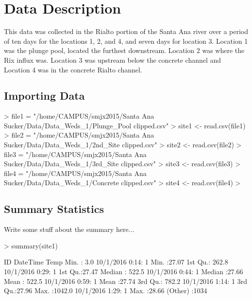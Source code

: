 \documentclass{article}
\begin{document}


\section{Data Description}

This data was collected in the Rialto portion of the Santa Ana river over a period of ten days for the locations 1, 2, and 4, and seven days for location 3. Location 1 was the plunge pool, located the furthest downstream. Location 2 was where the Rix influx was. Location 3 was upstream below the concrete channel and Location 4 was in the concrete Rialto channel. 


\subsection{Importing Data}


\begin{Schunk}
\begin{Sinput}
> file1 = "/home/CAMPUS/smjx2015/Santa Ana Sucker/Data/Data_Weds_1/Plunge_Pool clipped.csv"
> site1 <- read.csv(file1)
> file2 = "/home/CAMPUS/smjx2015/Santa Ana Sucker/Data/Data_Weds_1/2nd_Site clipped.csv"
> site2 <- read.csv(file2)
> file3 = "/home/CAMPUS/smjx2015/Santa Ana Sucker/Data/Data_Weds_1/3rd_Site clipped.csv"
> site3 <- read.csv(file3)
> file4 = "/home/CAMPUS/smjx2015/Santa Ana Sucker/Data/Data_Weds_1/Concrete clipped.csv"
> site4 <- read.csv(file4)
> 
\end{Sinput}
\end{Schunk}


\subsection{Summary Statistics}

Write some stuff about the summary here...
\begin{Schunk}
\begin{Sinput}
> summary(site1)
\end{Sinput}
\begin{Soutput}
       ID                   DateTime         Temp      
 Min.   :   3.0   10/1/2016 0:14:   1   Min.   :27.07  
 1st Qu.: 262.8   10/1/2016 0:29:   1   1st Qu.:27.47  
 Median : 522.5   10/1/2016 0:44:   1   Median :27.66  
 Mean   : 522.5   10/1/2016 0:59:   1   Mean   :27.74  
 3rd Qu.: 782.2   10/1/2016 1:14:   1   3rd Qu.:27.96  
 Max.   :1042.0   10/1/2016 1:29:   1   Max.   :28.66  
                  (Other)       :1034                  
\end{Soutput}
\end{Schunk}
\end{document}
